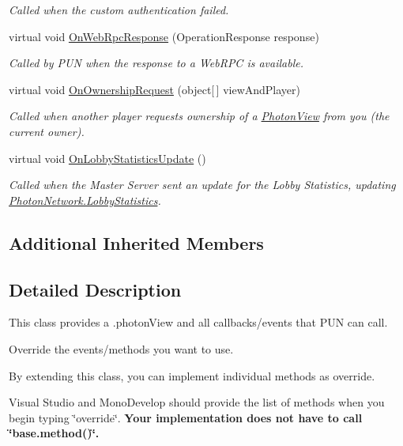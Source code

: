 \begin{DoxyCompactItemize}
\begin{DoxyCompactList}\small\item\em Called when the custom authentication failed. \end{DoxyCompactList}\item 
virtual void \hyperlink{class_photon_1_1_pun_behaviour_abddb6286cecb1409cbca26088328e86d}{On\+Web\+Rpc\+Response} (Operation\+Response response)
\begin{DoxyCompactList}\small\item\em Called by P\+UN when the response to a Web\+R\+PC is available. \end{DoxyCompactList}\item 
virtual void \hyperlink{class_photon_1_1_pun_behaviour_a943727ed00dbd38afc4b7d16c9c3454d}{On\+Ownership\+Request} (object\mbox{[}$\,$\mbox{]} view\+And\+Player)
\begin{DoxyCompactList}\small\item\em Called when another player requests ownership of a \hyperlink{class_photon_view}{Photon\+View} from you (the current owner). \end{DoxyCompactList}\item 
virtual void \hyperlink{class_photon_1_1_pun_behaviour_a945651c506d001121aa81e4fc8010a42}{On\+Lobby\+Statistics\+Update} ()
\begin{DoxyCompactList}\small\item\em Called when the Master Server sent an update for the Lobby Statistics, updating \hyperlink{class_photon_network_abdced09cccf61ae817cb97705ffce137}{Photon\+Network.\+Lobby\+Statistics}. \end{DoxyCompactList}\end{DoxyCompactItemize}
\subsection*{Additional Inherited Members}


\subsection{Detailed Description}
This class provides a .photon\+View and all callbacks/events that P\+UN can call. 

Override the events/methods you want to use. 

By extending this class, you can implement individual methods as override.

Visual Studio and Mono\+Develop should provide the list of methods when you begin typing \char`\"{}override\char`\"{}. {\bfseries Your implementation does not have to call \char`\"{}base.\+method()\char`\"{}.}

